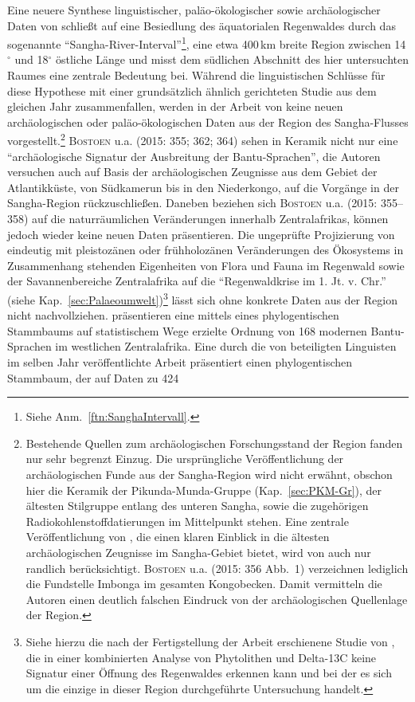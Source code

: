 \begin{multicols}{2}
Eine neuere Synthese linguistischer, paläo-ökologischer sowie archäologischer Daten von \textcite{Bostoen.2015} schließt auf eine Besiedlung des äquatorialen Regenwaldes durch das sogenannte \enquote{\mbox{Sangha}-River-Interval}\footnote{Siehe Anm.~\ref{ftn:SanghaIntervall}.}, eine etwa 400\,km breite Region zwischen 14$^\circ$ und 18$^\circ$ östliche Länge und misst dem südlichen Abschnitt des hier untersuchten Raumes eine zentrale Bedeutung bei. Während die linguistischen Schlüsse für diese Hypothese mit einer grundsätzlich ähnlich gerichteten Studie aus dem gleichen Jahr \parencite{Grollemund.2015} zusammenfallen, werden in der Arbeit von \textcite{Bostoen.2015} keine neuen archäologischen oder paläo-ökologischen Daten aus der Region des \mbox{Sangha}-Flusses vorgestellt.\footnote{Bestehende Quellen zum archäologischen Forschungsstand der Region fanden nur sehr begrenzt Einzug. Die ursprüngliche Veröffentlichung der archäologischen Funde aus der \mbox{Sangha}-Region \parencite{Eggert.1992} wird nicht erwähnt, obschon hier die Keramik der Pikunda-Munda-Gruppe (Kap.~\ref{sec:PKM-Gr}), der ältesten Stilgruppe entlang des unteren \mbox{Sangha}, sowie die zugehörigen Radiokohlenstoffdatierungen im Mittelpunkt stehen. Eine zentrale Veröffentlichung von \textcite{Eggert.1993}, die einen klaren Einblick in die ältesten archäologischen Zeugnisse im \mbox{Sangha}-Gebiet bietet, wird von \textcite{Bostoen.2015} auch nur randlich berücksichtigt. \textsc{Bostoen} u.a. (2015: 356 Abb.~1) verzeichnen lediglich die Fundstelle Imbonga im gesamten Kongobecken. Damit vermitteln die Autoren einen deutlich falschen Eindruck von der archäologischen Quellenlage der Region.} \textsc{Bostoen} u.a. (2015: 355; 362; 364) sehen in Keramik nicht nur eine \enquote{archäologische Signatur der Ausbreitung der Bantu-Sprachen}, die Autoren versuchen auch auf Basis der archäologischen Zeugnisse aus dem Gebiet der Atlantikküste, von Südkamerun bis in den Niederkongo, auf die Vorgänge in der \mbox{Sangha}-Region rückzuschließen. Daneben beziehen sich \textsc{Bostoen} u.a. (2015: 355--358) auf die naturräumlichen Veränderungen innerhalb Zentralafrikas, können jedoch wieder keine neuen Daten präsentieren. Die ungeprüfte Projizierung von eindeutig mit pleistozänen oder frühholozänen Veränderungen des Ökosystems in Zusammenhang stehenden Eigenheiten von Flora und Fauna im Regenwald sowie der Savannenbereiche Zentralafrika auf die \enquote{Regenwaldkrise im 1. Jt. v. Chr.} (siehe Kap.~\ref{sec:Palaeoumwelt})\footnote{Siehe hierzu die nach der Fertigstellung der Arbeit erschienene Studie von \textcite{Bremond.2017}, die in einer kombinierten Analyse von Phytolithen und Delta-13C keine Signatur einer Öffnung des Regenwaldes erkennen kann und bei der es sich um die einzige in dieser Region durchgeführte Untersuchung handelt.\label{ftn:Bremond2017}} lässt sich ohne konkrete Daten aus der Region nicht nachvollziehen. \textcite{Bostoen.2015} präsentieren eine mittels eines phylogentischen Stammbaums auf statistischem Wege erzielte Ordnung von 168 modernen Bantu-Sprachen im westlichen Zentralafrika. Eine durch die von \textcite{Bostoen.2015} beteiligten Linguisten im selben Jahr veröffentlichte Arbeit \parencite{Grollemund.2015} präsentiert einen phylogentischen Stammbaum, der auf Daten zu 424 
\end{multicols}
